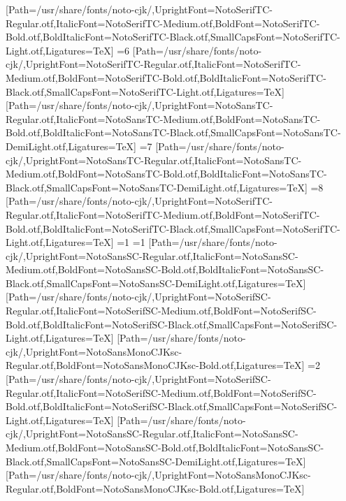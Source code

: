 [Path=/usr/share/fonts/noto-cjk/,UprightFont=NotoSerifTC-Regular.otf,ItalicFont=NotoSerifTC-Medium.otf,BoldFont=NotoSerifTC-Bold.otf,BoldItalicFont=NotoSerifTC-Black.otf,SmallCapsFont=NotoSerifTC-Light.otf,Ligatures=TeX]
\else\ifnum\value{CJKFonts}=6
[Path=/usr/share/fonts/noto-cjk/,UprightFont=NotoSerifTC-Regular.otf,ItalicFont=NotoSerifTC-Medium.otf,BoldFont=NotoSerifTC-Bold.otf,BoldItalicFont=NotoSerifTC-Black.otf,SmallCapsFont=NotoSerifTC-Light.otf,Ligatures=TeX]
[Path=/usr/share/fonts/noto-cjk/,UprightFont=NotoSansTC-Regular.otf,ItalicFont=NotoSansTC-Medium.otf,BoldFont=NotoSansTC-Bold.otf,BoldItalicFont=NotoSansTC-Black.otf,SmallCapsFont=NotoSansTC-DemiLight.otf,Ligatures=TeX]
\else\ifnum\value{CJKFonts}=7
[Path=/usr/share/fonts/noto-cjk/,UprightFont=NotoSansTC-Regular.otf,ItalicFont=NotoSansTC-Medium.otf,BoldFont=NotoSansTC-Bold.otf,BoldItalicFont=NotoSansTC-Black.otf,SmallCapsFont=NotoSansTC-DemiLight.otf,Ligatures=TeX]
\else\ifnum\value{CJKFonts}=8
[Path=/usr/share/fonts/noto-cjk/,UprightFont=NotoSerifTC-Regular.otf,ItalicFont=NotoSerifTC-Medium.otf,BoldFont=NotoSerifTC-Bold.otf,BoldItalicFont=NotoSerifTC-Black.otf,SmallCapsFont=NotoSerifTC-Light.otf,Ligatures=TeX]
\fi\fi\fi\fi\fi\fi\fi\fi\else
\ifnum\value{CJKLanguage}=1
\ifnum\value{CJKFonts}=1
[Path=/usr/share/fonts/noto-cjk/,UprightFont=NotoSansSC-Regular.otf,ItalicFont=NotoSansSC-Medium.otf,BoldFont=NotoSansSC-Bold.otf,BoldItalicFont=NotoSansSC-Black.otf,SmallCapsFont=NotoSansSC-DemiLight.otf,Ligatures=TeX]
[Path=/usr/share/fonts/noto-cjk/,UprightFont=NotoSerifSC-Regular.otf,ItalicFont=NotoSerifSC-Medium.otf,BoldFont=NotoSerifSC-Bold.otf,BoldItalicFont=NotoSerifSC-Black.otf,SmallCapsFont=NotoSerifSC-Light.otf,Ligatures=TeX]
[Path=/usr/share/fonts/noto-cjk/,UprightFont=NotoSansMonoCJKsc-Regular.otf,BoldFont=NotoSansMonoCJKsc-Bold.otf,Ligatures=TeX]
\else\ifnum\value{CJKFonts}=2
[Path=/usr/share/fonts/noto-cjk/,UprightFont=NotoSerifSC-Regular.otf,ItalicFont=NotoSerifSC-Medium.otf,BoldFont=NotoSerifSC-Bold.otf,BoldItalicFont=NotoSerifSC-Black.otf,SmallCapsFont=NotoSerifSC-Light.otf,Ligatures=TeX]
[Path=/usr/share/fonts/noto-cjk/,UprightFont=NotoSansSC-Regular.otf,ItalicFont=NotoSansSC-Medium.otf,BoldFont=NotoSansSC-Bold.otf,BoldItalicFont=NotoSansSC-Black.otf,SmallCapsFont=NotoSansSC-DemiLight.otf,Ligatures=TeX]
[Path=/usr/share/fonts/noto-cjk/,UprightFont=NotoSansMonoCJKsc-Regular.otf,BoldFont=NotoSansMonoCJKsc-Bold.otf,Ligatures=TeX]
